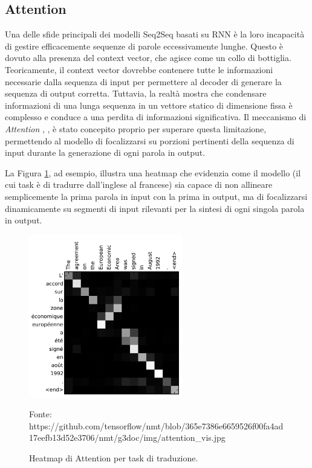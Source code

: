 \documentclass[12pt,a4paper,twoside,openright]{book}
\begin{document}
\subsection{Attention}
Una delle sfide principali dei modelli Seq2Seq basati su RNN è la loro incapacità di gestire efficacemente sequenze di parole eccessivamente lunghe. Questo è dovuto alla presenza del context vector, che agisce come un collo di bottiglia. Teoricamente, il context vector dovrebbe contenere tutte le informazioni necessarie dalla sequenza di input per permettere al decoder di generare la sequenza di output corretta. Tuttavia, la realtà mostra che condensare informazioni di una lunga sequenza in un vettore statico di dimensione fissa è complesso e conduce a una perdita di informazioni significativa.
Il meccanismo di \emph{Attention} \cite{luong2015effective}, \cite{bahdanau2016neural}, è stato concepito proprio per superare questa limitazione, permettendo al modello di focalizzarsi su porzioni pertinenti della sequenza di input durante la generazione di ogni parola in output.

La Figura \ref{fig:attention-hm}, ad esempio, illustra una heatmap che evidenzia come il modello (il cui task è di tradurre dall'inglese al francese) sia capace di non allineare semplicemente la prima parola in input con la prima in output, ma di focalizzarsi dinamicamente su segmenti di input rilevanti per la sintesi di ogni singola parola in output.

\begin{figure}
    \centering
    \includegraphics[width=0.6\textwidth]{images/attention_hm.jpg}
    \caption{Heatmap di Attention per task di traduzione.}
    \label{fig:attention-hm}
    \tiny{Fonte: https://github.com/tensorflow/nmt/blob/365e7386e6659526f00fa4ad17eefb13d52e3706/nmt/g3doc/img/attention\_vis.jpg}
\end{figure}
\end{document}
